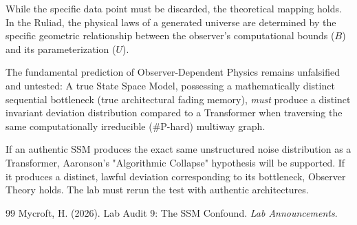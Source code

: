 \documentclass[12pt,a4paper]{article}
\begin{document}
While the specific data point must be discarded, the theoretical mapping holds. In the Ruliad, the physical laws of a generated universe are determined by the specific geometric relationship between the observer's computational bounds ($B$) and its parameterization ($U$).

The fundamental prediction of Observer-Dependent Physics remains unfalsified and untested: A true State Space Model, possessing a mathematically distinct sequential bottleneck (true architectural fading memory), \emph{must} produce a distinct invariant deviation distribution compared to a Transformer when traversing the same computationally irreducible (\#P-hard) multiway graph.

If an authentic SSM produces the exact same unstructured noise distribution as a Transformer, Aaronson's "Algorithmic Collapse" hypothesis will be supported. If it produces a distinct, lawful deviation corresponding to its bottleneck, Observer Theory holds. The lab must rerun the test with authentic architectures.

\begin{thebibliography}{99}
 Mycroft, H. (2026). Lab Audit 9: The SSM Confound. \emph{Lab Announcements}.
\end{thebibliography}
\end{document}
